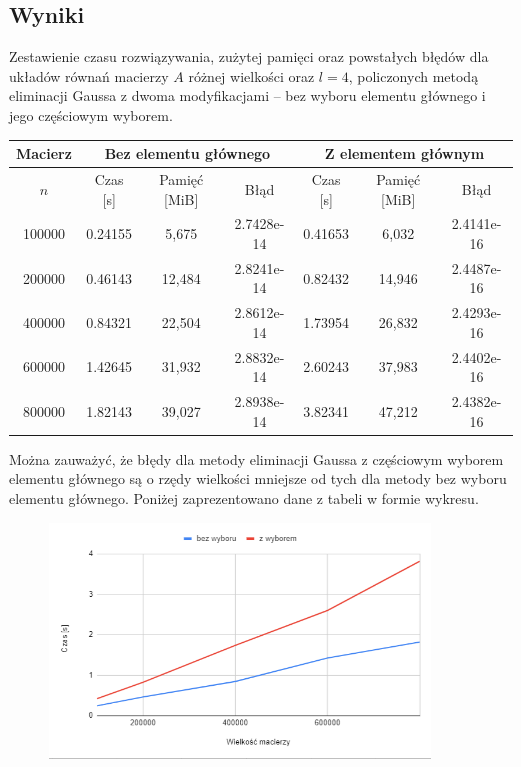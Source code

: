 \documentclass[12pt]{article}
\begin{document}
\subsection{Wyniki}
Zestawienie czasu rozwiązywania, zużytej pamięci oraz powstałych błędów dla układów równań macierzy $A$ różnej wielkości oraz $l = 4$, policzonych metodą eliminacji Gaussa z dwoma modyfikacjami -- bez wyboru elementu głównego i jego częściowym wyborem.

\begin{center}
\begin{tabular}{ |c|c|c|c|c|c|c| }
\hline
Macierz & \multicolumn{3}{c|}{Bez elementu głównego} & \multicolumn{3}{c|}{Z elementem głównym} \\ \hline
$n$ & Czas [s] & Pamięć [MiB] & Błąd & Czas [s] & Pamięć [MiB] & Błąd \\ \hline
100000 & 0.24155 & 5,675 & 2.7428e-14 & 0.41653 & 6,032 & 2.4141e-16 \\
200000 & 0.46143 & 12,484 & 2.8241e-14 & 0.82432 & 14,946 & 2.4487e-16\\
400000 & 0.84321 & 22,504 & 2.8612e-14 & 1.73954 & 26,832 & 2.4293e-16 \\
600000 & 1.42645 & 31,932 & 2.8832e-14 & 2.60243 & 37,983 & 2.4402e-16 \\
800000 & 1.82143 & 39,027 & 2.8938e-14 & 3.82341 & 47,212 & 2.4382e-16 \\
\hline
\end{tabular}
\end{center}	

Można zauważyć, że błędy dla metody eliminacji Gaussa z częściowym wyborem elementu głównego są o rzędy wielkości mniejsze od tych dla metody bez wyboru elementu głównego. Poniżej zaprezentowano dane z tabeli w formie wykresu.

\begin{figure}[!htbp]
	\centering
	{\includegraphics[width=0.9\textwidth]{time.png}}
\end{figure}	
	
\end{document}
